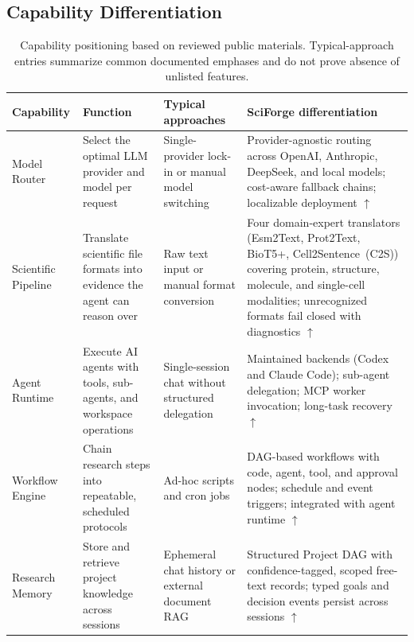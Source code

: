\documentclass[sn-basic,Numbered,pdflatex]{sn-jnl}
\begin{document}
\clearpage
\begin{appendices}
\renewcommand{\theHtable}{A.\arabic{table}}
\renewcommand{\theHfigure}{app.\Alph{section}.\arabic{figure}}

\section{Capability Differentiation}

\begin{table}[ht!]
\caption{Capability positioning based on reviewed public materials. Typical-approach entries summarize common documented emphases and do not prove absence of unlisted features.}
\label{tab:capability_differentiation}
\scriptsize
\centering
\setlength{\tabcolsep}{2pt}
\renewcommand{\arraystretch}{1.04}
\begin{tabular}{@{}L{2.1cm} L{2.7cm} L{3.2cm} L{3.8cm}@{}}
\toprule
\textbf{Capability} & \textbf{Function} & \textbf{Typical approaches} & SciForge differentiation \\
\midrule
Model Router
& Select the optimal LLM provider and model per request
& Single-provider lock-in or manual model switching
& Provider-agnostic routing across OpenAI, Anthropic, DeepSeek, and local models; cost-aware fallback chains; localizable deployment $\uparrow$ \\
Scientific Pipeline
& Translate scientific file formats into evidence the agent can reason over
& Raw text input or manual format conversion
& Four domain-expert translators (Esm2Text, Prot2Text, BioT5+, Cell2Sentence~(C2S)) covering protein, structure, molecule, and single-cell modalities; unrecognized formats fail closed with diagnostics $\uparrow$ \\
Agent Runtime
& Execute AI agents with tools, sub-agents, and workspace operations
& Single-session chat without structured delegation
& Maintained backends (Codex and Claude Code); sub-agent delegation; MCP worker invocation; long-task recovery $\uparrow$ \\
Workflow Engine
& Chain research steps into repeatable, scheduled protocols
& Ad-hoc scripts and cron jobs
& DAG-based workflows with code, agent, tool, and approval nodes; schedule and event triggers; integrated with agent runtime $\uparrow$ \\
Research Memory
& Store and retrieve project knowledge across sessions
& Ephemeral chat history or external document RAG
& Structured Project DAG with confidence-tagged, scoped free-text records; typed goals and decision events persist across sessions $\uparrow$ \\

\end{tabular}
\end{table}
\end{appendices}
\end{document}
